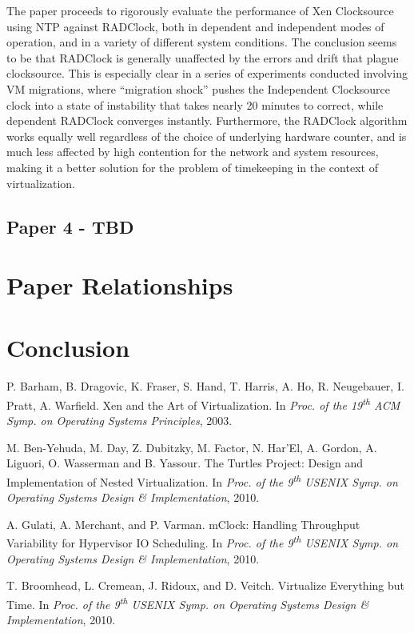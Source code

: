 \documentclass[10pt]{article}
\begin{document}
\begin{multicols*}{2}
The paper proceeds to rigorously evaluate the performance of Xen Clocksource
using NTP against RADClock, both in dependent and independent modes of
operation, and in a variety of different system conditions.  The conclusion
seems to be that RADClock is generally unaffected by the errors and
drift that plague clocksource.  This is especially clear in a series of
experiments conducted involving VM migrations, where ``migration shock''
pushes the Independent Clocksource clock into a state of instability that
takes nearly 20 minutes to correct, while dependent RADClock converges
instantly.  Furthermore, the RADClock algorithm works equally well
regardless of the choice of underlying hardware counter, and is much
less affected by high contention for the network and system resources,
making it a better solution for the problem of timekeeping in the
context of virtualization.

\subsection{Paper 4 - TBD}
\label{sec:summaries/tbd}

\section{Paper Relationships}
\label{sec:relationships}

\section{Conclusion}
\label{sec:conclusion}

\begin{thebibliography}{10}

{\footnotesize

	P. Barham, B. Dragovic, K. Fraser, S. Hand, T. Harris, A. Ho, R. Neugebauer,
	I. Pratt, A. Warfield.  Xen and the Art of Virtualization.  In {\it Proc. of
	the 19\textsuperscript{th} ACM Symp. on Operating Systems Principles}, 2003.

	M. Ben-Yehuda, M. Day, Z. Dubitzky, M. Factor, N. Har'El, A. Gordon, A. Liguori,
	O. Wasserman and B. Yassour.  The Turtles Project: Design and Implementation
	of Nested Virtualization.  In {\it Proc. of the 9\textsuperscript{th}
   USENIX Symp. on Operating Systems Design \& Implementation}, 2010.

	A. Gulati, A. Merchant, and P. Varman.  mClock: Handling Throughput Variability
	for Hypervisor IO Scheduling.  In {\it Proc. of the 9\textsuperscript{th}
   USENIX Symp. on Operating Systems Design \& Implementation}, 2010.

	T. Broomhead, L. Cremean, J. Ridoux, and D. Veitch.  Virtualize Everything but
	Time.  In {\it Proc. of the 9\textsuperscript{th}
   USENIX Symp. on Operating Systems Design \& Implementation}, 2010.

}

\end{thebibliography}

\end{multicols*}
\end{document}
